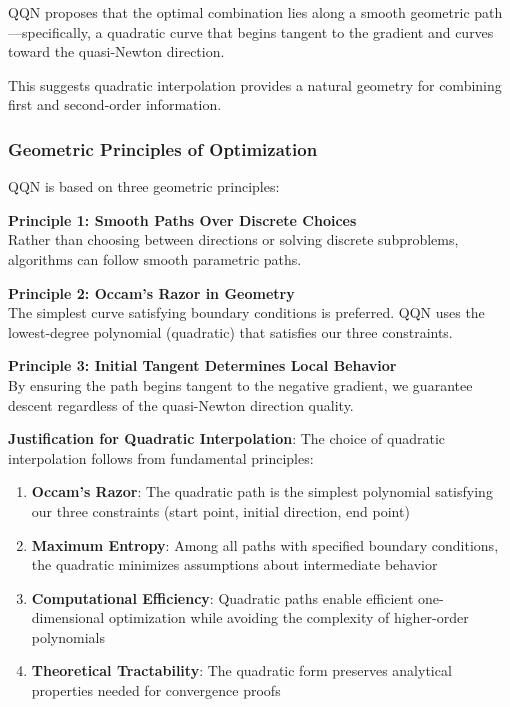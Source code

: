 QQN proposes that the optimal combination lies along a smooth geometric path---specifically, a quadratic curve that begins tangent to the gradient and curves toward the quasi-Newton direction.

This suggests quadratic interpolation provides a natural geometry for combining first and second-order information.

\hypertarget{geometric-principles-of-optimization}{%
\subsubsection{Geometric Principles of Optimization}\label{geometric-principles-of-optimization}}

QQN is based on three geometric principles:

\textbf{Principle 1: Smooth Paths Over Discrete Choices}\\
Rather than choosing between directions or solving discrete subproblems, algorithms can follow smooth parametric paths.

\textbf{Principle 2: Occam's Razor in Geometry}\\
The simplest curve satisfying boundary conditions is preferred. QQN uses the lowest-degree polynomial (quadratic) that satisfies our three constraints.

\textbf{Principle 3: Initial Tangent Determines Local Behavior}\\
By ensuring the path begins tangent to the negative gradient, we guarantee descent regardless of the quasi-Newton direction quality.

\textbf{Justification for Quadratic Interpolation}: The choice of quadratic interpolation follows from fundamental principles:

\begin{enumerate}
\def\labelenumi{\arabic{enumi}.}
\tightlist
\item
  \textbf{Occam's Razor}: The quadratic path is the simplest polynomial satisfying our three constraints (start point, initial direction, end point)
\item
  \textbf{Maximum Entropy}: Among all paths with specified boundary conditions, the quadratic minimizes assumptions about intermediate behavior
\item
  \textbf{Computational Efficiency}: Quadratic paths enable efficient one-dimensional optimization while avoiding the complexity of higher-order polynomials
\item
  \textbf{Theoretical Tractability}: The quadratic form preserves analytical properties needed for convergence proofs
\end{enumerate}

